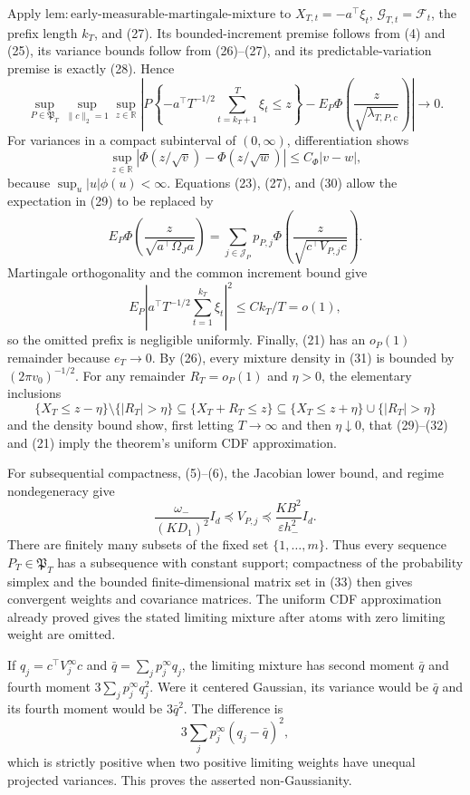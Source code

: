 Apply \(\mathrm{lem:early\text{-}measurable\text{-}martingale\text{-}mixture}\) to \(X_{T,t}=-a^\top\xi_t\), \(\mathcal G_{T,t}=\mathcal F_t\), the prefix length \(k_T\), and (27). Its bounded-increment premise follows from (4) and (25), its variance bounds follow from (26)--(27), and its predictable-variation premise is exactly (28). Hence
\[
 \sup_{P\in\mathfrak P_T}\sup_{\|c\|_2=1}\sup_{z\in\mathbb R}
 \left|P\left\{-a^\top T^{-1/2}\sum_{t=k_T+1}^T\xi_t\le z\right\}
 -E_P\Phi\left(\frac z{\sqrt{\lambda_{T,P,c}}}\right)\right|
 \longrightarrow0. \tag{29}
\]
For variances in a compact subinterval of \((0,\infty)\), differentiation shows
\[
 \sup_{z\in\mathbb R}\left|\Phi(z/\sqrt v)-\Phi(z/\sqrt w)\right|
 \le C_\Phi|v-w|, \tag{30}
\]
because \(\sup_u|u|\phi(u)<\infty\). Equations (23), (27), and (30) allow the expectation in (29) to be replaced by
\[
 E_P\Phi\left(\frac z{\sqrt{a^\top\Omega_Ja}}\right)
 =\sum_{j\in\mathcal J_P}p_{P,j}
 \Phi\left(\frac z{\sqrt{c^\top V_{P,j}c}}\right). \tag{31}
\]
Martingale orthogonality and the common increment bound give
\[
 E_P\left|a^\top T^{-1/2}\sum_{t=1}^{k_T}\xi_t\right|^2
 \le C k_T/T=o(1), \tag{32}
\]
so the omitted prefix is negligible uniformly. Finally, (21) has an \(o_P(1)\) remainder because \(e_T\to0\). By (26), every mixture density in (31) is bounded by \((2\pi v_0)^{-1/2}\). For any remainder \(R_T=o_P(1)\) and \(\eta>0\), the elementary inclusions
\[
 \{X_T\le z-\eta\}\setminus\{|R_T|>\eta\}
 \subseteq\{X_T+R_T\le z\}
 \subseteq\{X_T\le z+\eta\}\cup\{|R_T|>\eta\}
\]
and the density bound show, first letting \(T\to\infty\) and then \(\eta\downarrow0\), that (29)--(32) and (21) imply the theorem's uniform CDF approximation.

For subsequential compactness, (5)--(6), the Jacobian lower bound, and regime nondegeneracy give
\[
 \frac{\omega_-}{(KD_1)^2}I_d
 \preceq V_{P,j}
 \preceq\frac{KB^2}{\varepsilon h_-^2}I_d. \tag{33}
\]
There are finitely many subsets of the fixed set \(\{1,\ldots,m\}\). Thus every sequence \(P_T\in\mathfrak P_T\) has a subsequence with constant support; compactness of the probability simplex and the bounded finite-dimensional matrix set in (33) then gives convergent weights and covariance matrices. The uniform CDF approximation already proved gives the stated limiting mixture after atoms with zero limiting weight are omitted.

If \(q_j=c^\top V_j^\infty c\) and \(\bar q=\sum_jp_j^\infty q_j\), the limiting mixture has second moment \(\bar q\) and fourth moment \(3\sum_jp_j^\infty q_j^2\). Were it centered Gaussian, its variance would be \(\bar q\) and its fourth moment would be \(3\bar q^2\). The difference is
\[
 3\sum_jp_j^\infty(q_j-\bar q)^2, \tag{34}
\]
which is strictly positive when two positive limiting weights have unequal projected variances. This proves the asserted non-Gaussianity.

